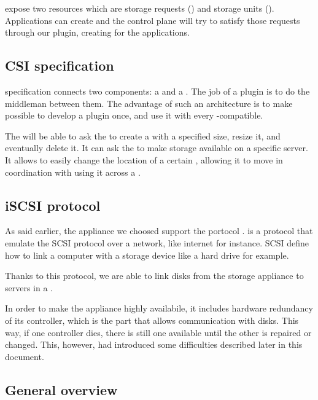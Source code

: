   expose two resources which are storage requests () and storage units (). Applications can create  and the  control plane will try to satisfy those requests through our  plugin, creating  for the applications.

\subsection{CSI specification}

 specification connects two components: a  and a . The job of a  plugin is to do the middleman between them. The advantage of such an architecture is to make possible to develop a plugin once, and use it with every  -compatible.

The  will be able to ask the  to create a  with a specified size, resize it, and eventually delete it. It can ask the  to make storage available on a specific server. It allows to easily change the location of a certain , allowing it to move in coordination with  using it across a .

\subsection{iSCSI protocol}

As said earlier, the appliance we choosed support the portocol .  is a protocol that emulate the SCSI protocol over a network, like internet for instance. SCSI define how to link a computer with a storage device like a hard drive for example.

Thanks to this protocol, we are able to link disks from the storage appliance to servers in a  .

In order to make the appliance highly availabile, it includes hardware redundancy of its controller, which is the part that allows communication with disks. This way, if one controller dies, there is still one available until the other is repaired or changed. This, however, had introduced some difficulties described later in this document.

\subsection{General overview}

